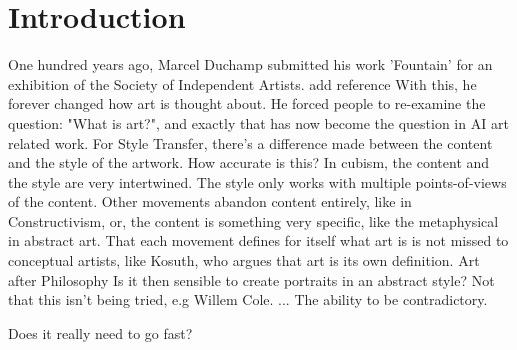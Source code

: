 \chapter*{Introduction}
\label{chap:intro}

One hundred years ago, Marcel Duchamp submitted his work 'Fountain' for an exhibition of the Society of Independent Artists. {add reference}
With this, he forever changed how art is thought about. He forced people to re-examine the question: "What is art?", and exactly that has now become the question in AI art related work.
For Style Transfer, there's a difference made between the content and the style of the artwork. How accurate is this?
In cubism, the content and the style are very intertwined. The style only works with multiple points-of-views of the content.
Other movements abandon content entirely, like in Constructivism, or, the content is something very specific, like the metaphysical in abstract art.
That each movement defines for itself what art is is not missed to conceptual artists, like Kosuth, who argues that art is its own definition. {Art after Philosophy}
Is it then sensible to create portraits in an abstract style? Not that this isn't being tried, e.g Willem Cole.
...
The ability to be contradictory.

Does it really need to go fast?
